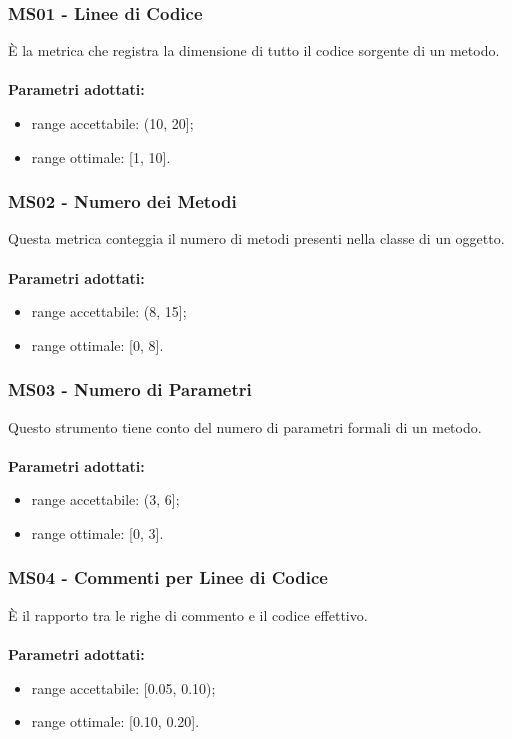 \subsubsection{MS01 - Linee di Codice}
È la metrica che registra la dimensione di tutto il codice sorgente di un metodo.\\ \\
\textbf{Parametri adottati:}
\begin{itemize}
\item range accettabile: (10, 20];
\item range ottimale: [1, 10].
\end{itemize}
\subsubsection{MS02 - Numero dei Metodi}
Questa metrica conteggia il numero di metodi presenti nella classe di un oggetto.\\ \\ 
\textbf{Parametri adottati:} 
\begin{itemize}
\item range accettabile: (8, 15];
\item range ottimale: [0, 8].
\end{itemize}
\subsubsection{MS03 - Numero di Parametri}
Questo strumento tiene conto del numero di parametri formali di un metodo.\\ \\ 
\textbf{Parametri adottati:} 
\begin{itemize}
\item range accettabile: (3, 6];
\item range ottimale: [0, 3].
\end{itemize}
\subsubsection{MS04 - Commenti per Linee di Codice}
È il rapporto tra le righe di commento e il codice effettivo.\\ \\ 
\textbf{Parametri adottati:} 
\begin{itemize}
\item range accettabile: [0.05, 0.10);
\item range ottimale: [0.10, 0.20].
\end{itemize}
